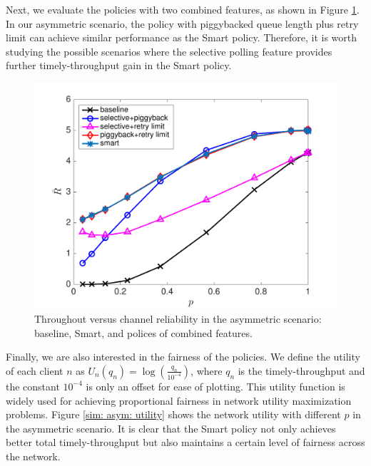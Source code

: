 \documentclass{article}
\begin{document}
Next, we evaluate the policies with two combined features, as shown in Figure \ref{sim: asym: combined}. In our asymmetric scenario, the policy with piggybacked queue length plus retry limit can achieve similar performance as the Smart policy. Therefore, it is worth studying the possible scenarios where the selective polling feature provides further timely-throughput gain in the Smart policy. 

\begin{figure}[htbp]
\centering
\includegraphics[scale=0.5]{asym_threecombinepolicys.pdf}
\caption{Throughout versus channel reliability in the asymmetric scenario: baseline, Smart, and polices of combined features.}
\label{sim: asym: combined}
\end{figure}


Finally, we are also interested in the fairness of the policies. We define the utility of each client $n$ as $U_n(q_n)=\log \left(\frac{q_n}{10^{-4}}\right)$, where $q_n$ is the timely-throughput and the constant $10^{-4}$ is only an offset for ease of plotting. This utility function is widely used for achieving proportional fairness in network utility maximization problems. Figure \ref{sim: asym: utility} shows the network utility with different $p$ in the asymmetric scenario. It is clear that the Smart policy not only achieves better total timely-throughput but also maintains a certain level of fairness across the network. 
\end{document}
